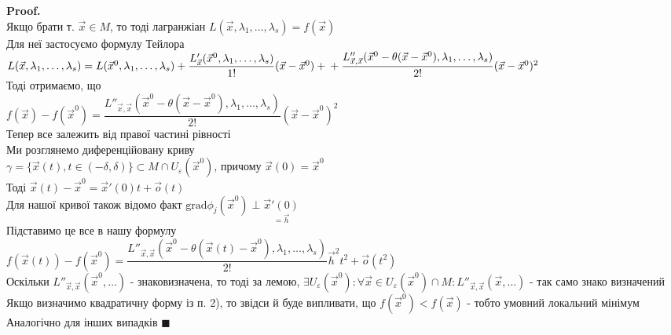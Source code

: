 \documentclass[a4paper, 14pt]{extarticle}
\theoremstyle{theoremdd}
\theoremstyle{theoremdd}
\theoremstyle{theoremdd}
\theoremstyle{theoremdd}
\theoremstyle{theoremdd}
\theoremstyle{theoremdd}
\theoremstyle{theoremdd}
\theoremstyle{theoremdd}
\newenvironment{pf}{\vspace*{-3mm} \textbf{Proof. \\}}{$\blacksquare$}
\begin{document}
\begin{pf}
Якщо брати т. $\vec{x} \in M$, то тоді лагранжіан $L(\vec{x}, \lambda_1, \dots, \lambda_s) = f(\vec{x})$\\
Для неї застосуємо формулу Тейлора\\
$L(\vec{x}, \lambda_1, \dots, \lambda_s) = L(\vec{x}^0, \lambda_1,\dots,\lambda_s) + \dfrac{L'_{\vec{x}}(\vec{x}^0,\lambda_1,\dots,\lambda_s)}{1!}(\vec{x}-\vec{x}^0) + \\ + \dfrac{L''_{\vec{x},\vec{x}}(\vec{x}^0 - \theta(\vec{x}-\vec{x}^0), \lambda_1,\dots,\lambda_s)}{2!}(\vec{x}-\vec{x}^0)^2$\\
Тоді отримаємо, що\\
$f(\vec{x})-f(\vec{x}^0) = \dfrac{L''_{\vec{x},\vec{x}}(\vec{x}^0 - \theta(\vec{x}-\vec{x}^0), \lambda_1,\dots,\lambda_s)}{2!}(\vec{x}-\vec{x}^0)^2$\\
Тепер все залежить від правої частині рівності\\
Ми розглянемо диференційовану криву \\ $\gamma = \{\vec{x}(t), t \in (-\delta,\delta) \} \subset M \cap U_{\varepsilon}(\vec{x}^0)$, причому $\vec{x}(0)=\vec{x}^0$\\
Тоді $\vec{x}(t) - \vec{x}^0 = \vec{x}'(0)t + \vec{o}(t)$\\
Для нашої кривої також відомо факт $\textrm{grad} \phi_j (\vec{x}^0) \perp \underset{=\vec{h}}{\vec{x}'(0)}$\\
Підставимо це все в нашу формулу\\
$f(\vec{x}(t)) -f(\vec{x}^0) = \dfrac{L''_{\vec{x},\vec{x}}(\vec{x}^0 - \theta(\vec{x}(t)-\vec{x}^0), \lambda_1,\dots,\lambda_s)}{2!}\vec{h}^2 t^2 + \vec{o}(t^2)$\\
Оскільки $L''_{\vec{x},\vec{x}}(\vec{x}^0,\dots)$ - знаковизначена, то тоді за лемою, $\exists U_{\varepsilon}(\vec{x}^0): \forall \vec{x} \in U_{\varepsilon}(\vec{x}^0) \cap M: L''_{\vec{x},\vec{x}}(\vec{x},\dots)$ - так само знако визначений\\
Якщо визначимо квадратичну форму із п. 2), то звідси й буде випливати, що $f(\vec{x}^0) < f(\vec{x})$ - тобто умовний локальний мінімум\\
Аналогічно для інших випадків
\end{pf}
\end{document}
